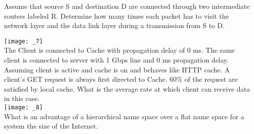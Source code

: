 \documentclass[answers,addpoints]{exam}
\begin{document}
\begin{questions}
\question
{}


\question
Assume that source S and destination D are connected through two intermediate routers labeled R. Determine how many times each packet has to visit the network layer and the data link layer during a transmission from S to D.\\
\texttt{[image: \_7]}\\

\question
The Client is connected to Cache with propagation delay of 0 ms. The  same client is connected to server with 1 Gbps line and 0 ms propagation delay. Assuming client is active and cache is on and behaves like HTTP cache. A client’s GET request is always first directed to Cache. 60\% of the request are satisfied by local cache. What is the average rate at which client can receive data in this case. \\
\texttt{[image: \_8]}\\
\vspace{2in}
\question
What is an advantage of a hierarchical name space over a flat name space for a system the size of the Internet.
\fillwithdottedlines{1in}



\end{questions}
\end{document}
